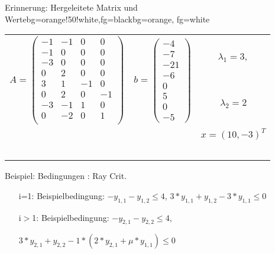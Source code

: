 \begin{frame}
	\begin{variableblock}{Erinnerung: Hergeleitete Matrix und Werte}{bg=orange!50!white,fg=black}{bg=orange, fg=white}
		\begin{tabular}{llc}
			\multirow{2}{*}{$A=\begin{pmatrix}
				-1 		& -1 		&  0		& 0		 \\
				-1 		& 0 		&  0		& 0		 \\
				-3 		& 0 		&  0		& 0		 \\
				0 		& 2 		&  0		& 0		 \\
				3 		& 1 		&  -1		& 0		 \\
				0 		& 2 		&  0		& -1	 \\
				-3 		& -1 		&  1		& 0		 \\
				0 		& -2 		&  0		& 1	 	 \\
				\end{pmatrix}$}&\multirow{2}{*}{$ b=\begin{pmatrix}
				-4 \\ -7 \\ -21 \\ -6 \\ 0 \\ 5 \\ 0 \\ -5
				\end{pmatrix} $}& $\lambda_1 = 3,$ \\
			& &  $\lambda_2 = 2$\\
			& & $x=(10, -3)^T$ \\
			& & \\
			& & \\
			& & \\
			& & \\
			& & \\
		\end{tabular}
	\end{variableblock}
	\vspace*{-.5em}
	\begin{exampleblock}{Beispiel: Bedingungen : Ray Crit.}
		\begin{itemize}
			\setlength{\itemindent}{0.25cm}
			\item[i=1:] Beispielbedingung: $-y_{1,1}-y_{1,2}\le 4$, $3*y_{1,1}+y_{1,2}-3*y_{1,1}\le0$
			\item[i$>$1:] Beispielbedingung: $-y_{2,1}-y_{2,2}\le 4$, 
			\item[] $3*y_{2,1}+y_{2,2}-1*(2*y_{2,1}+\mu*y_{1,1})\le0$
		\end{itemize}
	\end{exampleblock}
\end{frame}




